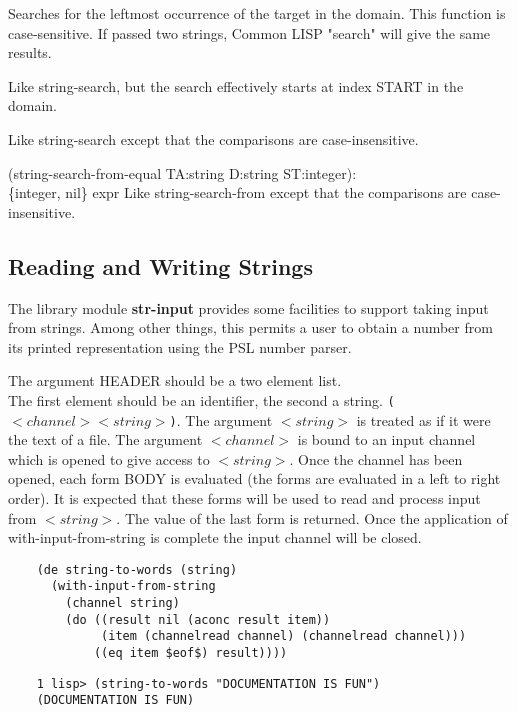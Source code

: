 {Searches  for  the  leftmost occurrence of the target
in the domain. This function is case-sensitive. If  passed  two
strings, Common LISP "search" will give the same results.
}

 {
    Like  string-search,  but  the  search effectively starts at
    index START in the domain.
}

{   Like  string-search  except   that   the   comparisons   are
    case-insensitive.  }

{(string-search-from-equal TA:string D:string ST:integer):\\
\{integer, nil\}}
{expr}
{ Like  string-search-from  except  that  the  comparisons are
    case-insensitive.
}

\subsection{Reading and Writing Strings}

  The library module {\bf str-input} provides  some  facilities  to
support  taking  input  from  strings.  Among other things, this
permits  a  user  to  obtain   a   number   from   its   printed
representation using the PSL number parser.


{    The argument HEADER should be a two element list. \\
The first element should be an identifier, the second a string.
{\tt ($<channel> <string>$)}.
    The argument $<string>$ is treated as if it were the text of a
    file.    The argument $<channel>$ is bound to an input channel
    which is opened  to  give  access  to  $<string>$.   Once  the
    channel  has  been  opened, each form BODY is evaluated (the
    forms are evaluated in a  left  to  right  order).    It  is
    expected  that  these forms will be used to read and process
    input from  $<string>$.    The  value  of  the  last  form  is
    returned.  Once the application of with-input-from-string is
    complete the input channel will be closed.
}

\begin{verbatim}
    (de string-to-words (string)
      (with-input-from-string
        (channel string)
        (do ((result nil (aconc result item))
             (item (channelread channel) (channelread channel)))
            ((eq item $eof$) result))))
\end{verbatim}
\begin{verbatim}
    1 lisp> (string-to-words "DOCUMENTATION IS FUN")
    (DOCUMENTATION IS FUN)
\end{verbatim}

